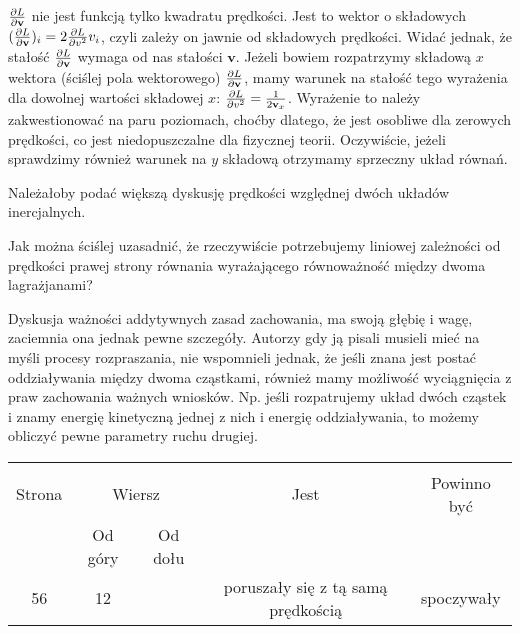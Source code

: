 \documentclass[a4paper,11pt]{article}
\begin{document}
\start {} $\frac{ \partial L }{ \partial \mathbf{v} }$ nie jest funkcją tylko
kwadratu prędkości. Jest to wektor o składowych
$( \frac{ \partial L }{ \partial \mathbf{v} } )_{ i } = 2 \frac{ \partial L }{ \partial { v^{ 2 } } } v_{
  i }$, czyli zależy on jawnie od składowych prędkości. Widać jednak,
że stałość $\frac{ \partial L }{ \partial \mathbf{v} }$ wymaga od nas stałości
$\mathbf{ v }$. Jeżeli bowiem rozpatrzymy składową $x$ wektora
(ściślej pola wektorowego) $\frac{ \partial L }{ \partial \mathbf{v} }$, mamy warunek
na stałość tego wyrażenia dla dowolnej wartości składowej $x$:
$\frac{ \partial L }{ \partial { v^{ 2 } } } = \frac{ 1 }{ 2 \mathbf{v}_{ x } }$.
Wyrażenie to należy zakwestionować na paru poziomach, choćby dlatego,
że jest osobliwe dla zerowych prędkości, co jest niedopuszczalne dla
fizycznej teorii. Oczywiście, jeżeli sprawdzimy również warunek na
$y$ składową otrzymamy sprzeczny układ równań.

\vspace{\spaceFour}



\start {} Należałoby podać większą dyskusję prędkości względnej
dwóch układów inercjalnych.

\vspace{\spaceFour}



\start {} Jak można ściślej uzasadnić, że rzeczywiście
potrzebujemy liniowej zależności od prędkości prawej strony równania
wyrażającego równoważność między dwoma lagrażjanami? \Dok

\vspace{\spaceFour}



\start {} Dyskusja ważności addytywnych zasad zachowania, ma
swoją głębię i wagę, zaciemnia ona jednak pewne szczegóły. Autorzy gdy
ją pisali musieli mieć na myśli procesy rozpraszania, nie wspomnieli
jednak, że jeśli znana jest postać oddziaływania między dwoma
cząstkami, również mamy możliwość wyciągnięcia z praw zachowania
ważnych wniosków. Np. jeśli rozpatrujemy układ dwóch cząstek i znamy
energię kinetyczną jednej z nich i energię oddziaływania, to możemy
obliczyć pewne parametry ruchu drugiej.







\begin{center}

  \begin{tabular}{|c|c|c|c|c|}
    \hline
    & \multicolumn{2}{c|}{} & & \\
    Strona & \multicolumn{2}{c|}{Wiersz} & Jest
                              & Powinno być \\ \cline{2-3}
    & Od góry & Od dołu & & \\
    \hline
    56  & 12 & & poruszały się z tą samą prędkością & spoczywały \\
    \hline
  \end{tabular}

\end{center}
\end{document}
